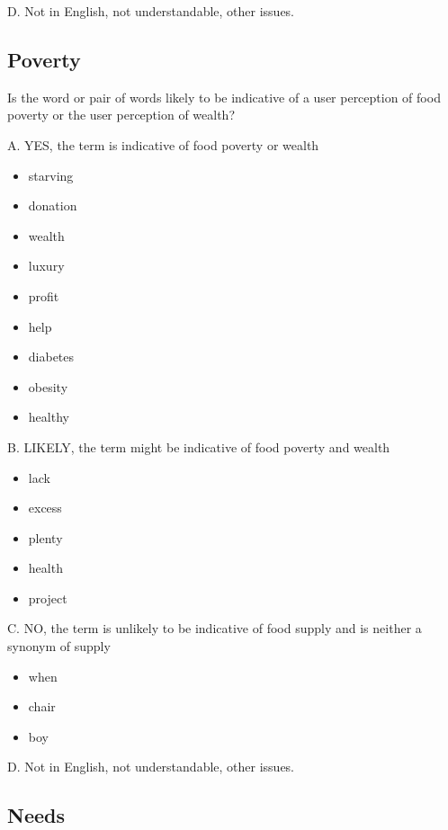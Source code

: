 D. Not in English, not understandable, other issues.



\subsection{Poverty}

Is the word or pair of words likely to be indicative of a user perception of food poverty or the user perception of wealth? 


A. YES, the term is indicative of food poverty or wealth

\begin{itemize}

  \item starving
  \item donation
  \item wealth 
  \item luxury
  \item profit
  \item help
  \item diabetes
  \item obesity
  \item healthy

\end{itemize}

B. LIKELY, the term might be indicative of food poverty and wealth\begin{itemize}
  \item lack
  \item excess
  \item plenty
  \item health 
  \item project
\end{itemize}

C. NO, the term is unlikely to be indicative of food supply and is neither a synonym of supply

\begin{itemize}
  \item when
  \item chair
  \item boy
\end{itemize}

D. Not in English, not understandable, other issues.



\subsection{Needs}


